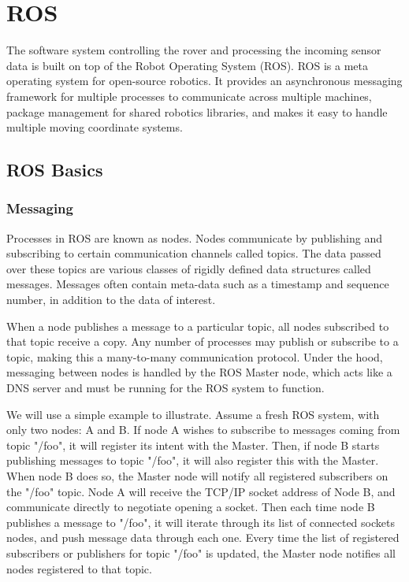 \chapter{ROS}

The software system controlling the rover and processing the incoming sensor data is built on top of the Robot Operating System (ROS). ROS is a meta operating system for open-source robotics. It provides an asynchronous messaging framework for multiple processes to communicate across multiple machines, package management for shared robotics libraries, and makes it easy to handle multiple moving coordinate systems.

\section{ROS Basics}

\subsection{Messaging}

Processes in ROS are known as nodes. Nodes communicate by publishing and subscribing to certain communication channels called topics. The data passed over these topics are various classes of rigidly defined data structures called messages. Messages often contain meta-data such as a timestamp and sequence number, in addition to the data of interest.

When a node publishes a message to a particular topic, all nodes subscribed to that topic receive a copy. Any number of processes may publish or subscribe to a topic, making this a many-to-many communication protocol. Under the hood, messaging between nodes is handled by the ROS Master node, which acts like a DNS server and must be running for the ROS system to function. 

We will use a simple example to illustrate. Assume a fresh ROS system, with only two nodes: A and B. If node A wishes to subscribe to messages coming from topic "/foo", it will register its intent with the Master. Then, if node B starts publishing messages to topic "/foo", it will also register this with the Master. When node B does so, the Master node will notify all registered subscribers on the "/foo" topic. Node A will receive the TCP/IP socket address of Node B, and communicate directly to negotiate opening a socket. Then each time node B publishes a message to "/foo", it will iterate through its list of connected sockets nodes, and push message data through each one. Every time the list of registered subscribers or publishers for topic "/foo" is updated, the Master node notifies all nodes registered to that topic.

